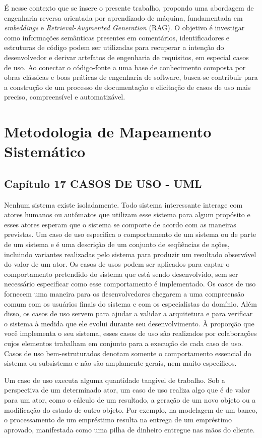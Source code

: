\documentclass[12pt,a4paper]{article}
\begin{document}
É nesse contexto que se insere o presente trabalho, propondo uma abordagem de engenharia reversa orientada por aprendizado de máquina, fundamentada em \textit{embeddings} e \textit{Retrieval-Augmented Generation} (RAG). O objetivo é investigar como informações semânticas presentes em comentários, identificadores e estruturas de código podem ser utilizadas para recuperar a intenção do desenvolvedor e derivar artefatos de engenharia de requisitos, em especial casos de uso. Ao conectar o código-fonte a uma base de conhecimento composta por obras clássicas e boas práticas de engenharia de software, busca-se contribuir para a construção de um processo de documentação e elicitação de casos de uso mais preciso, compreensível e automatizável.

\section{Metodologia de Mapeamento Sistemático}
\subsection{Capítulo 17
CASOS DE USO - UML}
Nenhum sistema existe isoladamente. Todo sistema interessante interage
com atores humanos ou autômatos que utilizam esse sistema para algum propósito e esses atores esperam que o sistema se comporte de acordo com as maneiras previstas. Um caso de uso especifica o comportamento de um sistema ou de
parte de um sistema e é uma descrição de um conjunto de seqüências de ações,
incluindo variantes realizadas pelo sistema para produzir um resultado observável do valor de um ator.
Os casos de usos podem ser aplicados para captar o comportamento pretendido do sistema que está sendo desenvolvido, sem ser necessário especificar
como esse comportamento é implementado. Os casos de uso fornecem uma maneira para os desenvolvedores chegarem a uma compreensão comum com os
usuários finais do sistema e com os especialistas do domínio. Além disso, os casos de uso servem para ajudar a validar a arquitetura e para verificar o sistema à
medida que ele evolui durante seu desenvolvimento. À proporção que você implementa o seu sistema, esses casos de uso são realizados por colaborações cujos
elementos trabalham em conjunto para a execução de cada caso de uso.
Casos de uso bem-estruturados denotam somente o comportamento essencial do sistema ou subsistema e não são amplamente gerais, nem muito específicos.

Um caso de uso executa alguma quantidade tangível de trabalho. Sob a
perspectiva de um determinado ator, um caso de uso realiza algo que é de valor
para um ator, como o cálculo de um resultado, a geração de um novo objeto ou
a modificação do estado de outro objeto. Por exemplo, na modelagem de um
banco, o processamento de um empréstimo resulta na entrega de um empréstimo aprovado, manifestada como uma pilha de dinheiro entregue nas mãos do
cliente.
\end{document}
